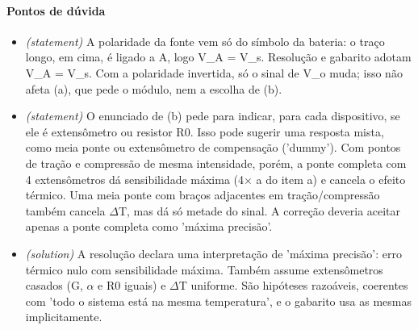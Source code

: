 \documentclass{article}%
\begin{document}
\paragraph{Pontos de dúvida}%
\begin{itemize}%
\item%
\textit{(statement)} A polaridade da fonte vem só do símbolo da bateria: o traço longo, em cima, é ligado a A, logo V\_A = V\_s. Resolução e gabarito adotam V\_A = V\_s. Com a polaridade invertida, só o sinal de V\_o muda; isso não afeta (a), que pede o módulo, nem a escolha de (b).%
\item%
\textit{(statement)} O enunciado de (b) pede para indicar, para cada dispositivo, se ele é extensômetro ou resistor R0. Isso pode sugerir uma resposta mista, como meia ponte ou extensômetro de compensação ('dummy'). Com pontos de tração e compressão de mesma intensidade, porém, a ponte completa com 4 extensômetros dá sensibilidade máxima (4$\times$ a do item a) e cancela o efeito térmico. Uma meia ponte com braços adjacentes em tração/compressão também cancela $\Delta$T, mas dá só metade do sinal. A correção deveria aceitar apenas a ponte completa como 'máxima precisão'.%
\item%
\textit{(solution)} A resolução declara uma interpretação de 'máxima precisão': erro térmico nulo com sensibilidade máxima. Também assume extensômetros casados (G, $\alpha$ e R0 iguais) e $\Delta$T uniforme. São hipóteses razoáveis, coerentes com 'todo o sistema está na mesma temperatura', e o gabarito usa as mesmas implicitamente.%
\end{itemize}%
\end{document}
